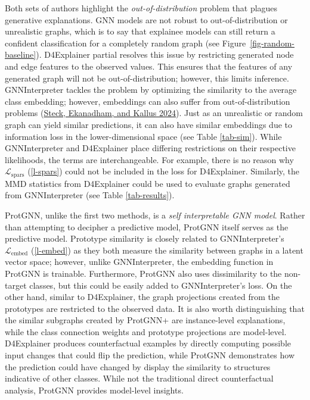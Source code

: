\documentclass[
  11pt,
  letterpaper,
]{article}
\begin{document}
\quad Both sets of authors highlight the \emph{out-of-distribution}
problem that plagues generative explanations. GNN models are not robust
to out-of-distribution or unrealistic graphs, which is to say that
explainee models can still return a confident classification for a
completely random graph (see Figure~\ref{fig-random-baseline}).
D4Explainer partial resolves this issue by restricting generated node
and edge features to the observed values. This ensures that the features
of any generated graph will not be out-of-distribution; however, this
limits inference. GNNInterpreter tackles the problem by optimizing the
similarity to the average class embedding; however, embeddings can also
suffer from out-of-distribution problems
(\protect\hyperlink{ref-Steck_Ekanadham_Kallus_2024}{Steck, Ekanadham,
and Kallus 2024}). Just as an unrealistic or random graph can yield
similar predictions, it can also have similar embeddings due to
information loss in the lower-dimensional space (see Table
\ref{tab-sim}). While GNNInterpreter and D4Explainer place differing
restrictions on their respective likelihoods, the terms are
interchangeable. For example, there is no reason why
\(\mathcal{L}_\text{spars}\) (\ref{l-spars}) could not be included in
the loss for D4Explainer. Similarly, the MMD statistics from D4Explainer
could be used to evaluate graphs generated from GNNInterpreter (see
Table \ref{tab-results}).

\quad ProtGNN, unlike the first two methods, is a \emph{self
interpretable GNN model}. Rather than attempting to decipher a
predictive model, ProtGNN itself serves as the predictive model.
Prototype similarity is closely related to GNNInterpreter's
\(\mathcal{L}_\text{embed}\) (\ref{l-embed}) as they both measure the
similarity between graphs in a latent vector space; however, unlike
GNNInterpreter, the embedding function in ProtGNN is trainable.
Furthermore, ProtGNN also uses dissimilarity to the non-target classes,
but this could be easily added to GNNInterpreter's loss. On the other
hand, similar to D4Explainer, the graph projections created from the
prototypes are restricted to the observed data. It is also worth
distinguishing that the similar subgraphs created by ProtGNN+ are
instance-level explanations, while the class connection weights and
prototype projections are model-level. D4Explainer produces
counterfactual examples by directly computing possible input changes
that could flip the prediction, while ProtGNN demonstrates how the
prediction could have changed by display the similarity to structures
indicative of other classes. While not the traditional direct
counterfactual analysis, ProtGNN provides model-level insights.
\end{document}
